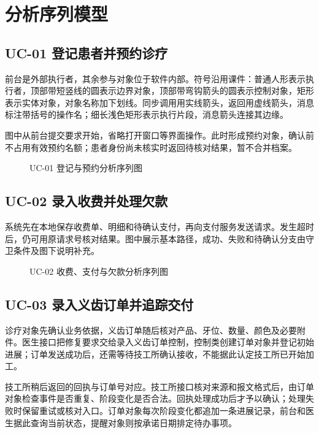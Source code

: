 \clearpage
\section{分析序列模型}
\subsection{UC-01 登记患者并预约诊疗}
前台是外部执行者，其余参与对象位于软件内部。符号沿用课件：普通人形表示执行者，顶部带短竖线的圆表示边界对象，顶部带弯钩箭头的圆表示控制对象，矩形表示实体对象，对象名称加下划线。同步调用用实线箭头，返回用虚线箭头，消息标注带括号的操作名；细长浅色矩形表示执行片段，消息箭头连接其边缘。

图中从前台提交要求开始，省略打开窗口等界面操作。此时形成预约对象，确认前不占用有效预约名额；患者身份尚未核实时返回待核对结果，暂不合并档案。

\begin{figure}[H]\centering
{}
\caption{UC-01 登记与预约分析序列图}\label{fig:seq-appointment}
\end{figure}

\clearpage
\subsection{UC-02 录入收费并处理欠款}
系统先在本地保存收费单、明细和待确认支付，再向支付服务发送请求。发生超时后，仍可用原请求号核对结果。图中展示基本路径，成功、失败和待确认分支由守卫条件及图下说明补充。

\begin{figure}[H]\centering
{}
\caption{UC-02 收费、支付与欠款分析序列图}\label{fig:seq-billing}
\end{figure}

\clearpage
\subsection{UC-03 录入义齿订单并追踪交付}
诊疗对象先确认业务依据，义齿订单随后核对产品、牙位、数量、颜色及必要附件。医生接口把修复要求交给录入义齿订单控制，控制类创建订单对象并登记初始进展；订单发送成功后，还需等待技工所确认接收，不能据此认定技工所已开始加工。

技工所稍后返回的回执与订单号对应。技工所接口核对来源和报文格式后，由订单对象检查事件是否重复、阶段变化是否合法。回执处理成功后才予以确认；处理失败时保留重试或核对入口。订单对象每次阶段变化都追加一条进展记录，前台和医生据此查询当前状态，提醒对象则按承诺日期排定待办事项。

